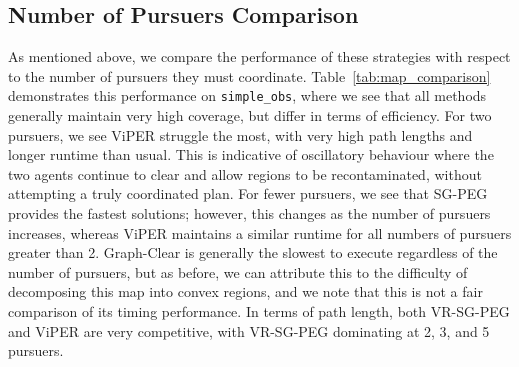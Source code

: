 \documentclass[conference]{IEEEtran}
\begin{document}
\subsection{Number of Pursuers Comparison}
As mentioned above, we compare the performance of these strategies with respect to the number of pursuers they must coordinate. Table~\ref{tab:map_comparison} demonstrates this performance on \texttt{simple\_obs}, where we see that all methods generally maintain very high coverage, but differ in terms of efficiency. For two pursuers, we see ViPER struggle the most, with very high path lengths and longer runtime than usual. This is indicative of oscillatory behaviour where the two agents continue to clear and allow regions to be recontaminated, without attempting a truly coordinated plan. For fewer pursuers, we see that SG-PEG provides the fastest solutions; however, this changes as the number of pursuers increases, whereas ViPER maintains a similar runtime for all numbers of pursuers greater than 2. Graph-Clear is generally the slowest to execute regardless of the number of pursuers, but as before, we can attribute this to the difficulty of decomposing this map into convex regions, and we note that this is not a fair comparison of its timing performance. In terms of path length, both VR-SG-PEG and ViPER are very competitive, with VR-SG-PEG dominating at 2, 3, and 5 pursuers.
\end{document}
